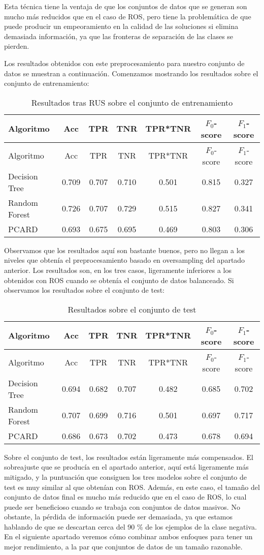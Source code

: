 \documentclass[
  a4paper,
,tablecaptionabove
]{scrartcl}
\begin{document}
Esta técnica tiene la ventaja de que los conjuntos de datos que se
generan son mucho más reducidos que en el caso de ROS, pero tiene la
problemática de que puede producir un empeoramiento en la calidad de las
soluciones si elimina demasiada información, ya que las fronteras de
separación de las clases se pierden.

Los resultados obtenidos con este preprocesamiento para nuestro conjunto
de datos se muestran a continuación. Comenzamos mostrando los resultados
sobre el conjunto de entrenamiento:

\begin{longtable}[]{@{}lcccccc@{}}
\caption{Resultados tras RUS sobre el conjunto de
entrenamiento}\tabularnewline
\toprule
Algoritmo & Acc & TPR & TNR & TPR*TNR & \(F_0\)-score &
\(F_1\)-score\tabularnewline
\midrule
\endfirsthead
\toprule
Algoritmo & Acc & TPR & TNR & TPR*TNR & \(F_0\)-score &
\(F_1\)-score\tabularnewline
\midrule
\endhead
Decision Tree & 0.709 & 0.707 & 0.710 & 0.501 & 0.815 &
0.327\tabularnewline
Random Forest & 0.726 & 0.707 & 0.729 & 0.515 & 0.827 &
0.341\tabularnewline
PCARD & 0.693 & 0.675 & 0.695 & 0.469 & 0.803 & 0.306\tabularnewline
\bottomrule
\end{longtable}

Observamos que los resultados aquí son bastante buenos, pero no llegan a
los niveles que obtenía el preprocesamiento basado en oversampling del
apartado anterior. Los resultados son, en los tres casos, ligeramente
inferiores a los obtenidos con ROS cuando se obtenía el conjunto de
datos balanceado. Si observamos los resultados sobre el conjunto de
test:

\begin{longtable}[]{@{}lcccccc@{}}
\caption{Resultados sobre el conjunto de test}\tabularnewline
\toprule
Algoritmo & Acc & TPR & TNR & TPR*TNR & \(F_0\)-score &
\(F_1\)-score\tabularnewline
\midrule
\endfirsthead
\toprule
Algoritmo & Acc & TPR & TNR & TPR*TNR & \(F_0\)-score &
\(F_1\)-score\tabularnewline
\midrule
\endhead
Decision Tree & 0.694 & 0.682 & 0.707 & 0.482 & 0.685 &
0.702\tabularnewline
Random Forest & 0.707 & 0.699 & 0.716 & 0.501 & 0.697 &
0.717\tabularnewline
PCARD & 0.686 & 0.673 & 0.702 & 0.473 & 0.678 & 0.694\tabularnewline
\bottomrule
\end{longtable}

Sobre el conjunto de test, los resultados están ligeramente más
compensados. El sobreajuste que se producía en el apartado anterior,
aquí está ligeramente más mitigado, y la puntuación que consiguen los
tres modelos sobre el conjunto de test es muy similar al que obtenían
con ROS. Además, en este caso, el tamaño del conjunto de datos final es
mucho más reducido que en el caso de ROS, lo cual puede ser beneficioso
cuando se trabaja con conjuntos de datos masivos. No obstante, la
pérdida de información puede ser demasiada, ya que estamos hablando de
que se descartan cerca del 90 \% de los ejemplos de la clase negativa.
En el siguiente apartado veremos cómo combinar ambos enfoques para tener
un mejor rendimiento, a la par que conjuntos de datos de un tamaño
razonable.
\end{document}
